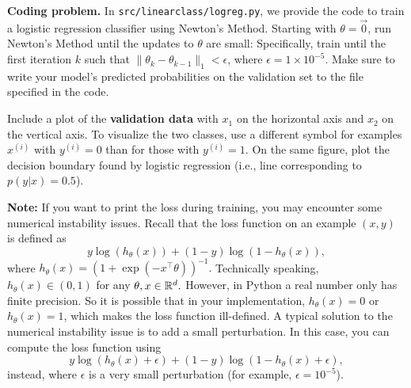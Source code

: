 \item {} \textbf{Coding problem.}
In \texttt{src/linearclass/logreg.py}, we provide the code to train a
logistic regression classifier using Newton's Method.
Starting with $\theta = \vec{0}$, run Newton's Method until the updates to
$\theta$ are small: Specifically,  train until the first iteration $k$ such
that $\|\theta_{k} - \theta_{k-1}\|_1 < \epsilon$, where
$\epsilon = 1\times 10^{-5}$. Make sure to write your model's predicted probabilities on
the validation set to the file specified in the code.

Include a plot of the \textbf{validation data} with $x_1$ on the horizontal axis and $x_2$ on the vertical axis.
To visualize the two classes, use a different symbol for examples $x^{(i)}$
with $y^{(i)} = 0$ than for those with $y^{(i)} = 1$. On the same figure, plot the decision boundary
found by logistic regression (i.e., line corresponding to $p(y|x) = 0.5$).

\textbf{Note:} If you want to print the loss during training, you may encounter some numerical instability issues. Recall that the loss function on an example $(x,y)$ is defined as
$$y\log(h_{\theta}(x)) +  (1 - y)\log(1 - h_{\theta}(x)),$$
where $h_\theta(x)=(1+\exp(-x^\top \theta))^{-1}.$ Technically speaking, $h_{\theta}(x)\in(0,1)$ for any $\theta,x\in\mathbb{R}^{d}.$ However, in Python a real number only has finite precision. So it is possible that in your implementation, $h_{\theta}(x)=0$ or $h_{\theta}(x)=1$, which makes the loss function ill-defined. A typical solution to the numerical instability issue is to add a small perturbation. In this case, you can compute the loss function using 
$$y\log(h_{\theta}(x) + \epsilon) +  (1 - y)\log(1 - h_{\theta}(x) + \epsilon),$$
instead, where $\epsilon$ is a very small perturbation (for example, $\epsilon=10^{-5}$).
